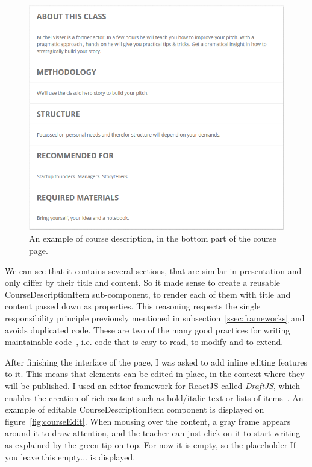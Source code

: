 \begin{figure}[H]
    \centering
    \includegraphics[scale=0.6]{figure/courseDescription.png}
    \caption{An example of course description, in the bottom part of the course page.}
    \label{fig:courseDescription}
\end{figure}

We can see that it contains several sections, that are similar in presentation and only differ by their title and content. So
it made sense to create a reusable \guillemotleft{} CourseDescriptionItem \guillemotright{} sub-component, to render each of them with title and content passed down as properties. This reasoning respects the single responsibility principle previously mentioned in {\sc subsection}~\ref{ssec:frameworks} and avoids duplicated code.
These are two of the many good practices for writing maintainable code~\cite{maintainable}, i.e. code that is easy to read, to modify and to extend.

After finishing the interface of the page, I was asked to add inline editing features to it. This means that elements can be edited in-place, in the context where they will be published. I used an editor framework for ReactJS called \textit{DraftJS}, which enables the creation of rich content such as bold/italic text or lists of items~\cite{draftJS}. An example of editable CourseDescriptionItem component is displayed on {\sc figure}~\ref{fig:courseEdit}. When mousing over the content, a gray frame appears around it to draw attention, and the teacher can just click on it to start writing as explained by the green tip on top. For now it is empty, so the placeholder \guillemotleft{} If you leave this empty... \guillemotright{} is displayed.

